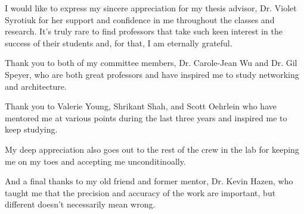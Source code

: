 I would like to express my sincere appreciation for my thesis advisor, Dr. Violet Syrotiuk for her support and confidence in me throughout the classes and research.
It's truly rare to find professors that take such keen interest in the success of their students and, for that, I am eternally grateful.

Thank you to both of my committee members, Dr. Carole-Jean Wu and Dr. Gil Speyer, who are both great professors and have inspired me to study networking and architecture. 

Thank you to Valerie Young, Shrikant Shah, and Scott Oehrlein who have mentored me at various points during the last three years and inspired me to keep studying.

My deep appreciation also goes out to the rest of the crew in the lab for keeping me on my toes and accepting me unconditinoally.

And a final thanks to my old friend and former mentor, Dr. Kevin Hazen, who taught me that the precision and accuracy of the work are important, but different doesn't necessarily mean wrong.

